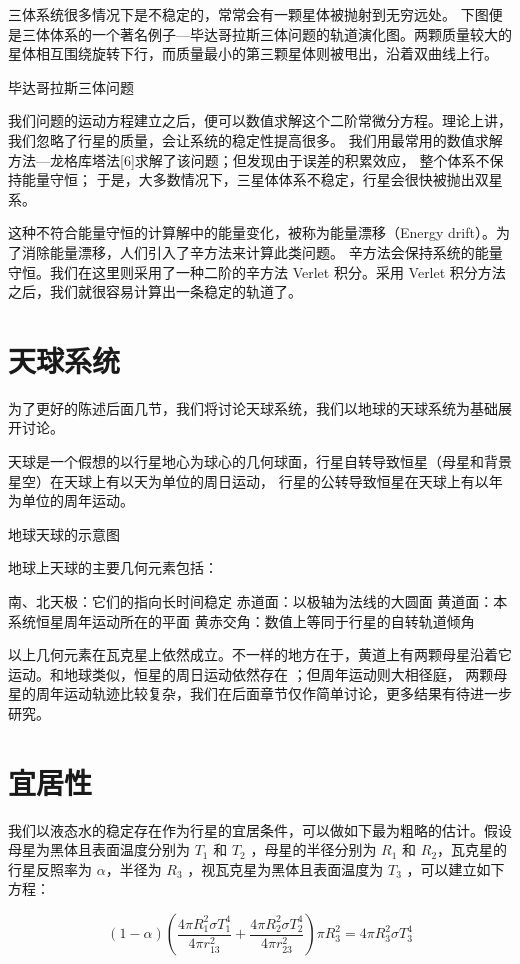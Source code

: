 \documentclass[a4paper,10.5pt]{book}
\begin{document}
三体系统很多情况下是不稳定的，常常会有一颗星体被抛射到无穷远处。
下图便是三体体系的一个著名例子—毕达哥拉斯三体问题的轨道演化图。两颗质量较大的星体相互围绕旋转下行，而质量最小的第三颗星体则被甩出，沿着双曲线上行。

毕达哥拉斯三体问题

我们问题的运动方程建立之后，便可以数值求解这个二阶常微分方程。理论上讲，我们忽略了行星的质量，会让系统的稳定性提高很多。
我们用最常用的数值求解方法—龙格库塔法[6]求解了该问题；但发现由于误差的积累效应， 整个体系不保持能量守恒；
于是，大多数情况下，三星体体系不稳定，行星会很快被抛出双星系。

这种不符合能量守恒的计算解中的能量变化，被称为能量漂移（Energy drift）。为了消除能量漂移，人们引入了辛方法来计算此类问题。
辛方法会保持系统的能量守恒。我们在这里则采用了一种二阶的辛方法 Verlet 积分。采用 Verlet 积分方法之后，我们就很容易计算出一条稳定的轨道了。

\section{天球系统}

为了更好的陈述后面几节，我们将讨论天球系统，我们以地球的天球系统为基础展开讨论。

天球是一个假想的以行星地心为球心的几何球面，行星自转导致恒星（母星和背景星空）在天球上有以天为单位的周日运动，
行星的公转导致恒星在天球上有以年为单位的周年运动。

地球天球的示意图

地球上天球的主要几何元素包括：

南、北天极：它们的指向长时间稳定
赤道面：以极轴为法线的大圆面
黄道面：本系统恒星周年运动所在的平面
黄赤交角：数值上等同于行星的自转轨道倾角

以上几何元素在瓦克星上依然成立。不一样的地方在于，黄道上有两颗母星沿着它运动。和地球类似，恒星的周日运动依然存在 ；但周年运动则大相径庭，
两颗母星的周年运动轨迹比较复杂，我们在后面章节仅作简单讨论，更多结果有待进一步研究。

\section{宜居性}

我们以液态水的稳定存在作为行星的宜居条件，可以做如下最为粗略的估计。假设母星为黑体且表面温度分别为 $T_1$ 和 $T_2$ ，母星的半径分别为 $R_1$ 和 $R_2$，瓦克星的行星反照率为 $\alpha$，半径为 $R_3$ ，视瓦克星为黑体且表面温度为 $T_3$  ，可以建立如下方程：

$$\left ( 1 - \alpha \right ) \left(  \frac{4 \pi R_1^2 \sigma T_1^4} {4 \pi r_{13}^2} + \frac{4 \pi R_2^2 \sigma T_2^4} {4 \pi r_{23}^2} \right ) \pi R_3^2= 4 \pi R_3^2 \sigma T_3^4$$
\end{document}
